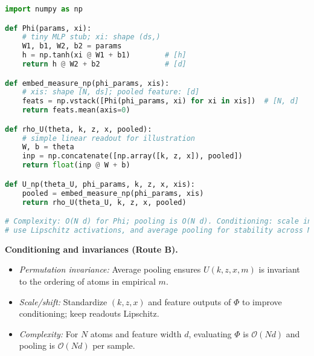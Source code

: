 ﻿\documentclass[11pt,letterpaper,oneside]{article}
\numberwithin{equation}{section}
\newcommand{\1}{\mathbf{1}}
\begin{document}
\begin{lstlisting}[language=Python,caption={Minimal NumPy sketch (DeepSets pooling and readout)}]
import numpy as np

def Phi(params, xi):
    # tiny MLP stub; xi: shape (ds,)
    W1, b1, W2, b2 = params
    h = np.tanh(xi @ W1 + b1)        # [h]
    return h @ W2 + b2               # [d]

def embed_measure_np(phi_params, xis):
    # xis: shape [N, ds]; pooled feature: [d]
    feats = np.vstack([Phi(phi_params, xi) for xi in xis])  # [N, d]
    return feats.mean(axis=0)

def rho_U(theta, k, z, x, pooled):
    # simple linear readout for illustration
    W, b = theta
    inp = np.concatenate([np.array([k, z, x]), pooled])
    return float(inp @ W + b)

def U_np(theta_U, phi_params, k, z, x, xis):
    pooled = embed_measure_np(phi_params, xis)
    return rho_U(theta_U, k, z, x, pooled)

# Complexity: O(N d) for Phi; pooling is O(N d). Conditioning: scale inputs,
# use Lipschitz activations, and average pooling for stability across N.
\end{lstlisting}

\begin{tcolorbox}[mathstyle]
\textbf{Conditioning and invariances (Route B).}
\begin{itemize}[leftmargin=1.15em,itemsep=0.25em]
  \item \emph{Permutation invariance:} Average pooling ensures $U(k,z,x,m)$ is invariant to the ordering of atoms in empirical $m$.
  \item \emph{Scale/shift:} Standardize $(k,z,x)$ and feature outputs of $\Phi$ to improve conditioning; keep readouts Lipschitz.
  \item \emph{Complexity:} For $N$ atoms and feature width $d$, evaluating $\Phi$ is $\mathcal O(N d)$ and pooling is $\mathcal O(N d)$ per sample.
\end{itemize}
\end{tcolorbox}
\end{document}
